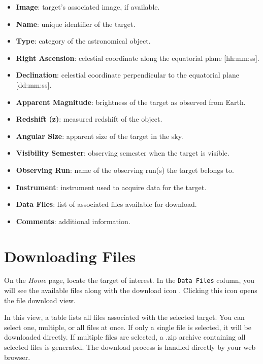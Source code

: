 \begin{itemize}
	\item \textbf{Image}: target's associated image, if available.
	\item \textbf{Name}: unique identifier of the target.
	\item \textbf{Type}: category of the astronomical object.
	\item \textbf{Right Ascension}: celestial coordinate along the equatorial plane [hh:mm:ss].
	\item \textbf{Declination}: celestial coordinate perpendicular to the equatorial plane [dd:mm:ss].
	\item \textbf{Apparent Magnitude}: brightness of the target as observed from Earth.
	\item \textbf{Redshift (z)}: measured redshift of the object.
	\item \textbf{Angular Size}: apparent size of the target in the sky.
	\item \textbf{Visibility Semester}: observing semester when the target is visible.
	\item \textbf{Observing Run}: name of the observing run(s) the target belongs to.
	\item \textbf{Instrument}: instrument used to acquire data for the target.
	\item \textbf{Data Files}: list of associated files available for download.
	\item \textbf{Comments}: additional information.
\end{itemize}



\chapter{Downloading Files} \label{chap:user-download-files} 
   	
On the \textsl{Home} page, locate the target of interest. In the \texttt{Data Files} column, you will see the available files along with the download icon {\scriptsize \grayblue{\faDownload{}}}. Clicking this icon opens the file download view.


In this view, a table lists all files associated with the selected target. You can select one, multiple, or all files at once. If only a single file is selected, it will be downloaded directly. If multiple files are selected, a .zip archive containing all selected files is generated. The download process is handled directly by your web browser.

